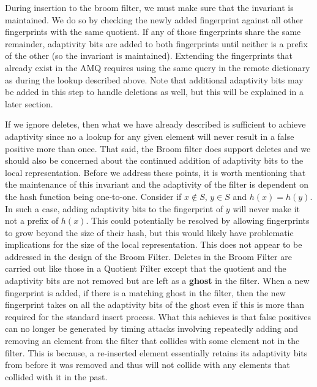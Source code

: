 \documentclass[../paper.tex]{subfiles}
\begin{document}
During insertion to the broom filter, we must make sure that the invariant is maintained.
We do so by checking the newly added fingerprint against all other fingerprints with
the same quotient. If any of those fingerprints share the same remainder, adaptivity bits are
added to both fingerprints until neither is a prefix of the other (so the invariant
is maintained). Extending the fingerprints that already exist in the AMQ requires using
the same query in the remote dictionary as during the lookup described above. Note that additional
adaptivity bits may be added in this step to handle deletions as well, but this will be
explained in a later section.

     If we ignore deletes, then what we have already described is sufficient to
     achieve adaptivity since no a lookup for any given element will never
     result in a false positive more than once.  That said, the Broom filter
     does support deletes and we should also be concerned about the continued
     addition of adaptivity bits to the local representation.  Before we
     address these points, it is worth mentioning that the maintenance of this
     invariant and the adaptivity of the filter is dependent on the hash
     function being one-to-one.  Consider if $x \notin S$, $y \in S$ and  $h(x)
     = h(y)$.  In such a case, adding adaptivity bits to the fingerprint of $y$
     will never make it not a prefix of $h(x)$.  This could potentially be
     resolved by allowing fingerprints to grow beyond the size of their hash,
     but this would likely have problematic implications for the size of the
     local representation.  This does not appear to be addressed in the design
     of the Broom Filter.  Deletes in the Broom Filter are carried out like
     those in a Quotient Filter except that the quotient and the adaptivity
     bits are not removed but are left as a {\bf ghost} in the filter.  When a
     new fingerprint is added, if there is a matching ghost in the filter, then
     the new fingerprint takes on all the adaptivity bits of the ghost even  if
     this is more than required for the standard insert process.  What this
     achieves is that false positives can no longer be generated by timing
     attacks involving repeatedly adding and removing an element from the
     filter that collides with some element not in the filter.  This is
     because, a re-inserted element essentially retains its adaptivity bits
     from before it was removed and thus will not collide with any elements
     that collided with it in the past.   
	 
\end{document}

